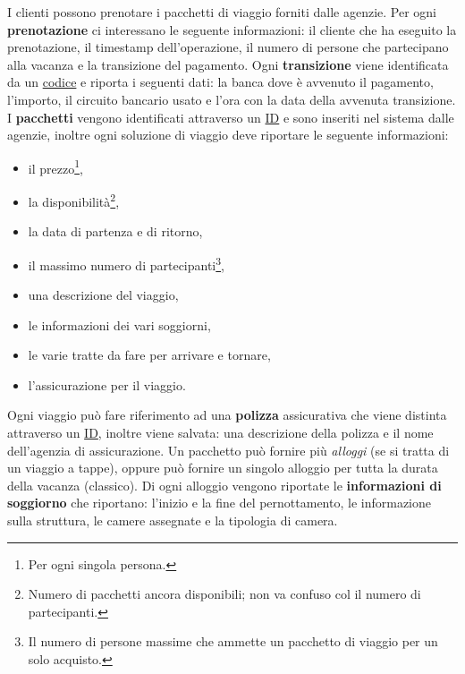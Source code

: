 %
%
I clienti possono prenotare i pacchetti di viaggio forniti dalle agenzie. Per ogni \textbf{prenotazione} ci interessano le seguente informazioni: il cliente che ha eseguito la prenotazione, il timestamp dell'operazione, il numero di persone che partecipano alla vacanza e la transizione del pagamento.
%
%
Ogni \textbf{transizione} viene identificata da un \underline{codice} e riporta i seguenti dati: la banca dove è avvenuto il pagamento, l'importo, il circuito bancario usato e l'ora con la data della avvenuta transizione.
%
%
I \textbf{pacchetti} vengono identificati attraverso un \underline{ID} e sono inseriti nel sistema dalle agenzie, inoltre ogni soluzione di viaggio deve riportare le seguente informazioni:
\begin{multicols}{3}
\begin{itemize}
    \item il prezzo\footnote{Per ogni singola persona.},
    \item la disponibilità\footnote{Numero di pacchetti ancora disponibili; non va confuso col il numero di partecipanti.},
    \item la data di partenza e di ritorno,
    \item il massimo numero di partecipanti\footnote{Il numero di persone massime che ammette un pacchetto di viaggio per un solo acquisto.},
    \item una descrizione del viaggio,
    \item le informazioni dei vari soggiorni,
    \item le varie tratte da fare per arrivare e tornare,
    \item l'assicurazione per il viaggio.
\end{itemize}
\end{multicols}
Ogni viaggio può fare riferimento ad una \textbf{polizza} assicurativa che viene distinta attraverso un \underline{ID}, inoltre viene salvata: una descrizione della polizza e il nome dell'agenzia di assicurazione.
%
%
Un pacchetto può fornire più \emph{alloggi} (se si tratta di un viaggio a tappe), oppure può fornire un singolo alloggio per tutta la durata della vacanza (classico). Di ogni alloggio vengono riportate le \textbf{informazioni di soggiorno} che riportano: l'inizio e la fine del pernottamento, le informazione sulla struttura, le camere assegnate e la tipologia di camera. 

